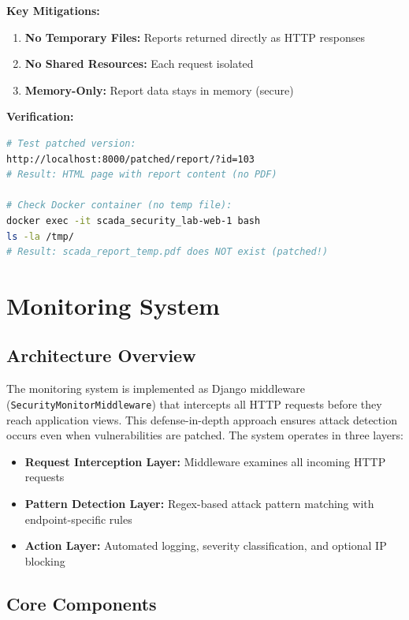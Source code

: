\documentclass[12pt,a4paper]{article}
\begin{document}
\textbf{Key Mitigations:}
\begin{enumerate}[leftmargin=*]
    \item \textbf{No Temporary Files:} Reports returned directly as HTTP responses
    \item \textbf{No Shared Resources:} Each request isolated
    \item \textbf{Memory-Only:} Report data stays in memory (secure)
\end{enumerate}

\textbf{Verification:}
\begin{lstlisting}[language=bash]
# Test patched version:
http://localhost:8000/patched/report/?id=103
# Result: HTML page with report content (no PDF)

# Check Docker container (no temp file):
docker exec -it scada_security_lab-web-1 bash
ls -la /tmp/
# Result: scada_report_temp.pdf does NOT exist (patched!)
\end{lstlisting}

\newpage

\section{Monitoring System}

\subsection{Architecture Overview}

The monitoring system is implemented as Django middleware (\texttt{SecurityMonitorMiddleware}) that intercepts all HTTP requests before they reach application views. This defense-in-depth approach ensures attack detection occurs even when vulnerabilities are patched. The system operates in three layers:

\begin{itemize}[leftmargin=*]
    \item \textbf{Request Interception Layer:} Middleware examines all incoming HTTP requests
    \item \textbf{Pattern Detection Layer:} Regex-based attack pattern matching with endpoint-specific rules
    \item \textbf{Action Layer:} Automated logging, severity classification, and optional IP blocking
\end{itemize}

\subsection{Core Components}
\end{document}
